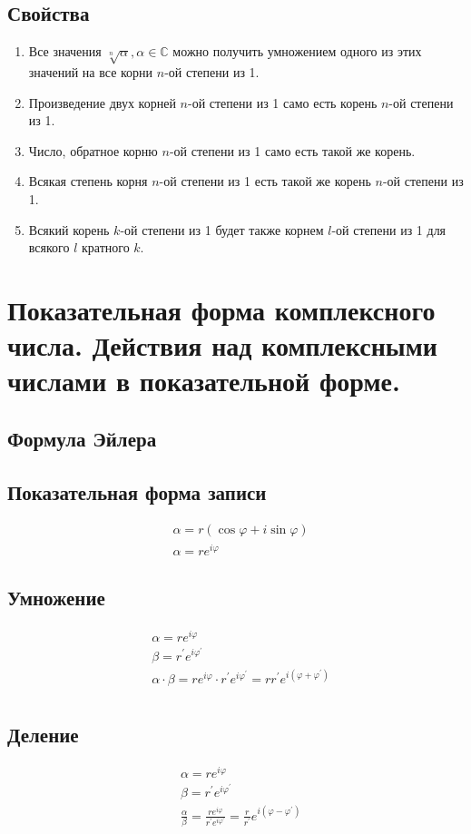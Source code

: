 \documentclass[12pt, fleqn]{article}
\begin{document}
\subsection*{Свойства}
\begin{enumerate}
	\item Все значения $\sqrt[n]{\alpha}, \alpha \in \mathbb{C}$ можно получить умножением одного из этих значений на все корни $n$-ой степени из 1.
	\item Произведение двух корней $n$-ой степени из 1 само есть корень $n$-ой степени из 1.
	\item Число, обратное корню $n$-ой степени из 1 само есть такой же корень.
	\item Всякая степень корня $n$-ой степени из 1 есть такой же корень $n$-ой степени из 1.
	\item Всякий корень $k$-ой степени из 1 будет также корнем $l$-ой степени из 1 для всякого $l$ кратного $k$.
\end{enumerate}
\section{Показательная форма комплексного числа. Действия над комплексными числами в показательной форме.}
\subsection*{Формула Эйлера}
\subsection*{Показательная форма записи}
\begin{align*}
	&\alpha=r\left(\cos\varphi+i\sin\varphi\right)\\
	&\alpha=re^{i\varphi}
\end{align*}
\subsection*{Умножение}
\begin{align*}
	&\alpha=re^{i\varphi}\\
	&\beta=r^\prime e^{i\varphi^\prime}\\
	&\alpha\cdot\beta=re^{i\varphi}\cdot r^\prime e^{i\varphi^\prime}=rr^\prime e^{i\left(\varphi+\varphi^\prime\right)}\\
\end{align*}
\subsection*{Деление}
\begin{align*}
	&\alpha=re^{i\varphi}\\
	&\beta=r^\prime e^{i\varphi^\prime}\\
	&\frac{\alpha}{\beta}=\frac{re^{i\varphi}}{r^\prime e^{i\varphi^\prime}}= \frac{r}{r^\prime} e^{i\left(\varphi-\varphi^\prime\right)}\\
\end{align*}
\end{document}
